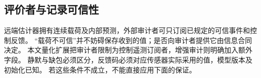 \subsection{评价者与记录可信性}
远端估计器拥有连续载荷及内部预测，外部审计者可只订阅已规定的可信事件和控制反馈。
“载荷不可信”并不妨碍保存收到的值；是否向审计者提供它由信息合同决定。
本文量化扩展把审计者限制为控制遥测订阅者，增强审计则明确加入额外字段。
静默与缺包必须区分，反馈码必须对应传感器实际采用的值，模型版本及初始化已知。
若这些条件不成立，不能直接应用下面的保证。
